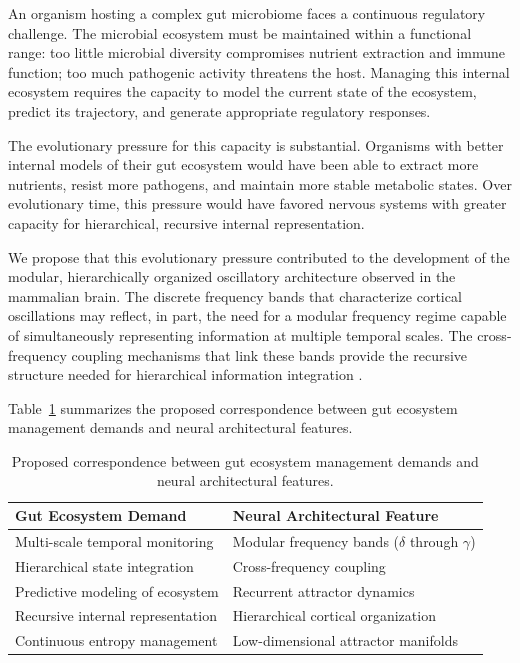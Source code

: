 \documentclass[12pt,a4paper]{article}
\begin{document}
An organism hosting a complex gut microbiome faces a continuous regulatory challenge.
The microbial ecosystem must be maintained within a functional range: too little microbial diversity compromises nutrient extraction and immune function; too much pathogenic activity threatens the host.
Managing this internal ecosystem requires the capacity to model the current state of the ecosystem, predict its trajectory, and generate appropriate regulatory responses.

The evolutionary pressure for this capacity is substantial.
Organisms with better internal models of their gut ecosystem would have been able to extract more nutrients, resist more pathogens, and maintain more stable metabolic states.
Over evolutionary time, this pressure would have favored nervous systems with greater capacity for hierarchical, recursive internal representation.

We propose that this evolutionary pressure contributed to the development of the modular, hierarchically organized oscillatory architecture observed in the mammalian brain.
The discrete frequency bands that characterize cortical oscillations \cite{Buzsaki2006} may reflect, in part, the need for a modular frequency regime capable of simultaneously representing information at multiple temporal scales.
The cross-frequency coupling mechanisms that link these bands \cite{Canolty2006, Tort2009} provide the recursive structure needed for hierarchical information integration \cite{Lisman2005}.

Table~\ref{tab:gut_brain} summarizes the proposed correspondence between gut ecosystem management demands and neural architectural features.

\begin{table}[H]
\centering
\caption{Proposed correspondence between gut ecosystem management demands and neural architectural features.}
\label{tab:gut_brain}
\begin{tabular}{ll}
\toprule
\textbf{Gut Ecosystem Demand} & \textbf{Neural Architectural Feature} \\
\midrule
Multi-scale temporal monitoring & Modular frequency bands ($\delta$ through $\gamma$) \\
Hierarchical state integration & Cross-frequency coupling \\
Predictive modeling of ecosystem & Recurrent attractor dynamics \\
Recursive internal representation & Hierarchical cortical organization \\
Continuous entropy management & Low-dimensional attractor manifolds \\
\bottomrule
\end{tabular}
\end{table}
\end{document}
